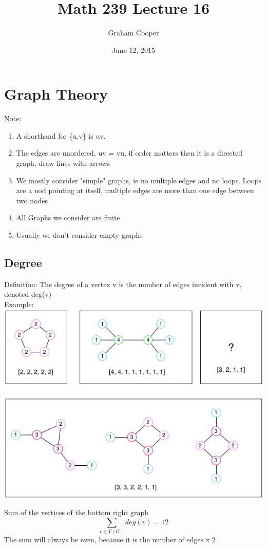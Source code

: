 \documentclass[12pt]{article}
\title{\vspace{-15ex}Math 239 Lecture 16\vspace{-1ex}}
\date{June 12, 2015}
\author{Graham Cooper}
\begin{document}
	\maketitle
	\section*{Graph Theory}
	Note:\\
	\begin{enumerate}
		\item A shorthand for \{u,v\} is uv.
		\item The edges are unordered, uv = vu, if order matters then it is a directed graph, draw lines with arrows
		\item We mostly consider "simple" graphs, ie no multiple edges and no loops. Loops are a nod pointing at itself, multiple edges are more than one edge between two nodes
		\item All Graphs we consider are finite
		\item Usually we don't consider empty graphs
	\end{enumerate}
	
	\subsection*{Degree}
	Definition: The degree of a vertex v is the number of edges incident with v, denoted deg(v)\\
	
	Example: \\
	\includegraphics[scale=0.5]{degree_seq_graphs.png}
	
	Sum of the vertices of the bottom right graph
	$$\sum_{v \in V(G)} deg(v) = 12$$
	The sum will always be even, because it is the number of edges x 2\\
	
\end{document}
